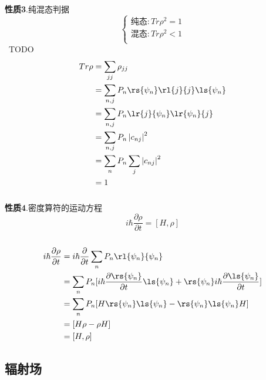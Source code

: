 \begin{frame}
  \frametitle{}
  \textbf{性质3}.纯混态判据 \\ 
  \[ \begin{cases}
  \text{纯态}: Tr \rho^2=1 \\
  \text{混态}: Tr \rho^2<1 \\
  \end{cases} \]
  \证~TODO
  \[ \begin{aligned}
    Tr \rho &= \sum_{jj} \rho_{jj} \\ 
    &= \sum_{n,j} P_n\rs{\psi_n} \rl{j}{j} \ls{\psi_n} \\
    &= \sum_{n,j} P_n \lr{j}{\psi_n} \lr{\psi_n}{j} \\
    &= \sum_{n,j} P_n \left|c_{nj}\right|^2 \\
    &= \sum_{n} P_n \sum_{j}\left|c_{nj}\right|^2 \\
    &=1
\end{aligned} \]   
\end{frame}

\begin{frame}
  \frametitle{}
  \textbf{性质4}.密度算符的运动方程 \\ 
  \[ i\hbar \frac{\partial \rho}{\partial t} = [H,\rho]\]
  \证~
  \[ \begin{aligned}
    i\hbar \frac{\partial \rho}{\partial t}  &= i\hbar \frac{\partial }{\partial t} \sum_nP_n\rl{\psi_n}{\psi_n}  \\ 
    &= \sum_nP_n [i\hbar\frac{\partial \rs{\psi_n} }{\partial t} \ls{\psi_n} + \rs{\psi_n} i\hbar\frac{\partial \ls{\psi_n}}{\partial t} ] \\
    &= \sum_nP_n [ H \rs{\psi_n} \ls{\psi_n} - \rs{\psi_n} \ls{\psi_n}H ] \\
    &= [ H \rho  - \rho H ] \\
    &= [ H ,\rho] 
\end{aligned} \]   
\end{frame}

\subsection{辐射场}